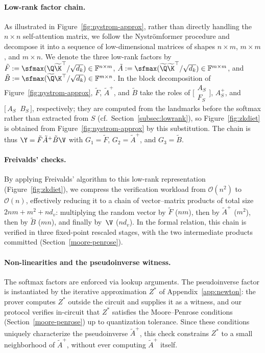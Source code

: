 \documentclass[runningheads]{llncs}
\begin{document}
\paragraph{Low-rank factor chain.}
As illustrated in Figure~\ref{fig:nystrom-approx}, rather than directly handling the $n \times n$ self-attention matrix, we follow the Nystr\"omformer procedure and decompose it into a sequence of low-dimensional matrices of shapes $n \times m$, $m \times m$, and $m \times n$. We denote the three low-rank factors by
$\tilde{F} := \sfmax(\Q\widetilde{\K}^{\top}/\sqrt{d_k}) \in \mathbb{F}^{n \times m}$,
$\tilde{A} := \sfmax(\widetilde{\Q}\widetilde{\K}^{\top}/\sqrt{d_k}) \in \mathbb{F}^{m \times m}$, and
$\tilde{B} := \sfmax(\widetilde{\Q}\K^{\top}/\sqrt{d_k}) \in \mathbb{F}^{m \times n}$.
In the block decomposition of Figure~\ref{fig:nystrom-approx}, $\tilde{F}$, $\tilde{A}^{+}$, and $\tilde{B}$ take the roles of
$\bigl[\begin{smallmatrix} A_S \\ F_S \end{smallmatrix}\bigr]$,
$A_S^{+}$, and $\bigl[\, A_S \;\; B_S \,\bigr]$, respectively;
they are computed from the landmarks before the softmax rather than extracted from $S$ (cf.\ Section~\ref{subsec:lowrank}), so Figure~\ref{fig:zkdiet} is obtained from Figure~\ref{fig:nystrom-approx} by this substitution. The chain is thus $\Y = \tilde{F}\tilde{A}^{+}\tilde{B}\V$ with $G_1 = \tilde F$, $G_2 = \tilde A^{+}$, and $G_3 = \tilde B$.

\paragraph{Freivalds' checks.}
By applying Freivalds' algorithm to this low-rank representation (Figure~\ref{fig:zkdiet}), we compress the verification workload from $\mathcal{O}(n^2)$ to $\mathcal{O}(n)$, effectively reducing it to a chain of vector--matrix products of total size $2nm + m^2 + nd_v$: multiplying the random vector by $\tilde{F}$ ($nm$), then by $\tilde{A}^{+}$ ($m^2$), then by $\tilde{B}$ ($mn$), and finally by~$\V$ ($nd_v$). In the formal relation, this chain is verified in three fixed-point rescaled stages, with the two intermediate products committed (Section~\ref{moore-penrose}).

\paragraph{Non-linearities and the pseudoinverse witness.}
The softmax factors are enforced via lookup arguments. The pseudoinverse factor is instantiated by the iterative approximation $Z^{*}$ of Appendix~\ref{app:newton}: the prover computes $Z^{*}$ outside the circuit and supplies it as a witness, and our protocol verifies in-circuit that $Z^{*}$ satisfies the Moore--Penrose conditions (Section~\ref{moore-penrose}) up to quantization tolerance. Since these conditions uniquely characterize the pseudoinverse $\tilde{A}^{+}$, this check constrains $Z^{*}$ to a small neighborhood of $\tilde{A}^{+}$, without ever computing $\tilde{A}^{+}$ itself.
\end{document}
